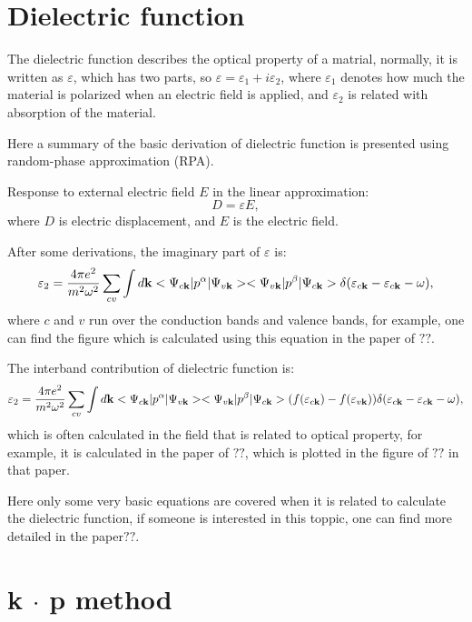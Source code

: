 \documentclass[a4paper, 12pt, titlepage,oneside,drop]{kthesis}
\begin{document}
\chapter{Dielectric function}
The dielectric function describes the optical property of a matrial, normally, it is written as $\varepsilon$, which has two parts, so $\varepsilon = \varepsilon_1
+ i \varepsilon_2$, where $\varepsilon_1$ denotes how much the material is polarized when an electric field is applied, and $\varepsilon_2$ is related with absorption of the material.

Here a summary of the basic derivation of dielectric function is presented using random-phase approximation (RPA).

Response to external electric field $E$ in the linear approximation:
\begin{equation}\label{df1}
D = \varepsilon E,
\end{equation}
where $D$ is electric displacement, and $E$ is the electric field.

After some derivations, the imaginary part of $\varepsilon$ is:
\begin{equation}\label{df2}
\varepsilon_2 = \frac{4 \pi e^2}{m^2\omega^2} \sum_{cv} \int d \textbf {k} <\Psi_{c{\textbf k}}|p^\alpha|\Psi_{v{\textbf k}}><\Psi_{v{\textbf k}}|p^\beta|\Psi_{c{\textbf k}}>\delta(\varepsilon_{c {\textbf k}}-\varepsilon_{c{\textbf k}}-\omega),
\end{equation}
where $c$ and $v$ run over the conduction bands and valence bands, for example, one can find the figure which is calculated using this equation in the paper of $??$.

The interband contribution of dielectric function is:
\begin{equation}\label{df2}
\varepsilon_2 = \frac{4 \pi e^2}{m^2\omega^2} \sum_{cv} \int d \textbf {k} <\Psi_{c{\textbf k}}|p^\alpha|\Psi_{v{\textbf k}}><\Psi_{v{\textbf k}}|p^\beta|\Psi_{c{\textbf k}}> (f(\varepsilon_{c \textbf k})-f(\varepsilon_{v \textbf k}))\delta(\varepsilon_{c {\textbf k}}-\varepsilon_{c{\textbf k}}-\omega),
\end{equation}
which is often calculated in the field that is related to optical property, for example, it is calculated in the paper of $??$, which is plotted in the figure of $??$ in 
that paper.

Here only some very basic equations are covered when it is related to calculate the dielectric function, if someone is interested in this toppic, one can find more detailed in the paper$??$.
\chapter{k $\cdot$ p method}
\end{document}
